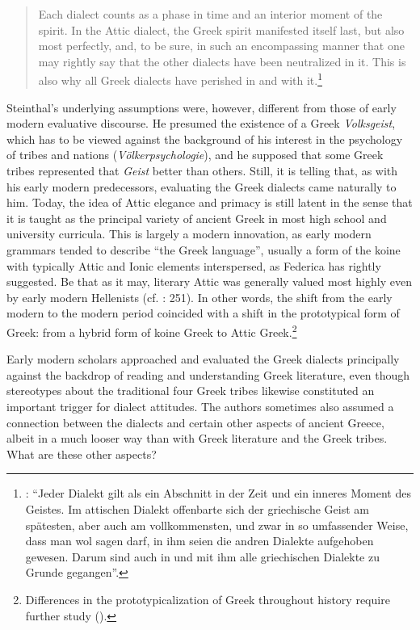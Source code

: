 \begin{quote}
Each dialect counts as a phase in time and an interior moment of the spirit. In the Attic dialect, the Greek spirit manifested itself last, but also most perfectly, and, to be sure, in such an encompassing manner that one may rightly say that the other dialects have been neutralized in it. This is also why all Greek dialects have perished in and with it.\footnote{\citet[9]{Steinthal1891}: “Jeder Dialekt gilt als ein Abschnitt in der Zeit und ein inneres Moment des Geistes. Im attischen Dialekt offenbarte sich der griechische Geist am spätesten, aber auch am vollkommensten, und zwar in so umfassender Weise, dass man wol sagen darf, in ihm seien die andren Dialekte aufgehoben gewesen. Darum sind auch in und mit ihm alle griechischen Dialekte zu Grunde gegangen”.}
\end{quote}

Steinthal’s underlying assumptions were, however, different from those of early modern evaluative discourse. He presumed the existence of a Greek \textit{Volksgeist}, which has to be viewed against the background of his interest in the psychology of tribes and nations (\textit{Völkerpsychologie}), and he supposed that some Greek tribes represented that \textit{Geist} better than others. Still, it is telling that, as with his early modern predecessors, evaluating the Greek dialects came naturally to him. Today, the idea of Attic elegance and primacy is still latent in the sense that it is taught as the principal variety of ancient Greek in most high school and university curricula. This is largely a modern innovation, as early modern grammars tended to describe “the Greek language”, usually a form of the koine with typically Attic and Ionic elements interspersed, as Federica \citet[123]{Ciccolella2008} has rightly suggested. Be that as it may, literary Attic was generally valued most highly even by early modern Hellenists (cf. \citealt{Roelcke2014}: 251). In other words, the shift from the early modern to the modern period coincided with a shift in the prototypical form of Greek: from a hybrid form of koine Greek to Attic Greek.\footnote{Differences in the prototypicalization of Greek throughout history require further study (\citealt{VanRooyFcb}).}

Early modern scholars approached and evaluated the Greek dialects principally against the backdrop of reading and understanding Greek literature, even though stereotypes about the traditional four Greek tribes likewise constituted an important trigger for dialect attitudes. The authors sometimes also assumed a connection between the dialects and certain other aspects of ancient Greece, albeit in a much looser way than with Greek literature and the Greek tribes. What are these other aspects?


